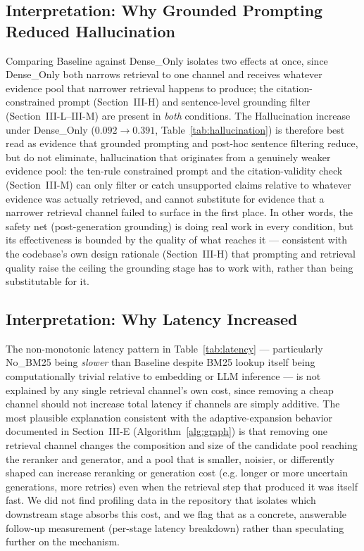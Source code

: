 \documentclass[conference]{IEEEtran}
\begin{document}
\subsection{Interpretation: Why Grounded Prompting Reduced Hallucination}
Comparing Baseline against Dense\_Only isolates two effects at once, since Dense\_Only both narrows retrieval to one channel and receives whatever evidence pool that narrower retrieval happens to produce; the citation-constrained prompt (Section~III-H) and sentence-level grounding filter (Section~III-L--III-M) are present in \emph{both} conditions. The Hallucination increase under Dense\_Only ($0.092 \rightarrow 0.391$, Table~\ref{tab:hallucination}) is therefore best read as evidence that grounded prompting and post-hoc sentence filtering reduce, but do not eliminate, hallucination that originates from a genuinely weaker evidence pool: the ten-rule constrained prompt and the citation-validity check (Section~III-M) can only filter or catch unsupported claims relative to whatever evidence was actually retrieved, and cannot substitute for evidence that a narrower retrieval channel failed to surface in the first place. In other words, the safety net (post-generation grounding) is doing real work in every condition, but its effectiveness is bounded by the quality of what reaches it --- consistent with the codebase's own design rationale (Section~III-H) that prompting and retrieval quality raise the ceiling the grounding stage has to work with, rather than being substitutable for it.

\subsection{Interpretation: Why Latency Increased}
The non-monotonic latency pattern in Table~\ref{tab:latency} --- particularly No\_BM25 being \emph{slower} than Baseline despite BM25 lookup itself being computationally trivial relative to embedding or LLM inference --- is not explained by any single retrieval channel's own cost, since removing a cheap channel should not increase total latency if channels are simply additive. The most plausible explanation consistent with the adaptive-expansion behavior documented in Section~III-E (Algorithm~\ref{alg:graph}) is that removing one retrieval channel changes the composition and size of the candidate pool reaching the reranker and generator, and a pool that is smaller, noisier, or differently shaped can increase reranking or generation cost (e.g. longer or more uncertain generations, more retries) even when the retrieval step that produced it was itself fast. We did not find profiling data in the repository that isolates which downstream stage absorbs this cost, and we flag that as a concrete, answerable follow-up measurement (per-stage latency breakdown) rather than speculating further on the mechanism.
\end{document}
